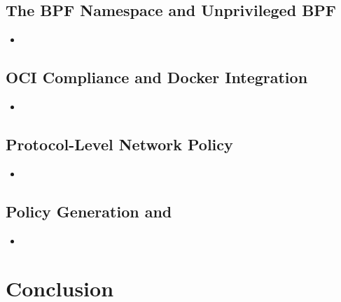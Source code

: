 \subsection{The BPF Namespace and Unprivileged BPF}

\begin{inprogress}
  \begin{itemize}
    \item
  \end{itemize}
\end{inprogress}

\subsection{OCI Compliance and Docker Integration}

\begin{inprogress}
  \begin{itemize}
    \item
  \end{itemize}
\end{inprogress}

\subsection{Protocol-Level Network Policy}

\begin{inprogress}
  \begin{itemize}
    \item
  \end{itemize}
\end{inprogress}

\subsection{\bpfcontain{} Policy Generation and }

\begin{inprogress}
  \begin{itemize}
    \item
  \end{itemize}
\end{inprogress}



\section{Conclusion}
\label{s:disc-conclusion}

